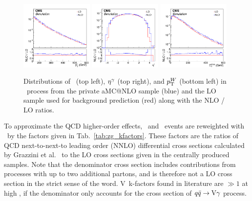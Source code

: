 \begin{figure}[htbp]
  \centering
  \includegraphics[width=0.32\textwidth]{Analysis/Figures/kfactor/WG_ptg.pdf}
  \includegraphics[width=0.32\textwidth]{Analysis/Figures/kfactor/WG_etag.pdf}
  \includegraphics[width=0.32\textwidth]{Analysis/Figures/kfactor/WG_met.pdf}
  \caption{
    Distributions of \ETg\ (top left), $\eta^{\gamma}$ (top right), and $p_{\mathrm{T}}^{{W}}$ (bottom left) in \wlng\ process from the private aMC@NLO sample (blue) and the LO sample used for background prediction (red) along with the NLO / LO ratios.
  }
  \label{fig:wg_nlo_lo}
\end{figure}

To approximate the QCD higher-order effects, \zinvg\ and \wlng\ events are reweighted with \ETg\ by the factors given in Tab.~\ref{tab:zg_kfactors}. 
These factors are the ratios of QCD next-to-next-to leading order (NNLO) differential cross sections calculated by Grazzini et al.~\cite{Bozzi:2010xn} to the LO cross sections given in the centrally produced samples. 
Note that the denominator cross section includes contributions from processes with up to two additional partons, and is therefore not a LO cross section in the strict sense of the word. V\Pgg\ k-factors found in literature are $\gg 1$ at high \ETg, if the denominator only accounts for the cross section of ${q}\bar{{q}}\rightarrow\mathrm{V}\gamma$ process.

